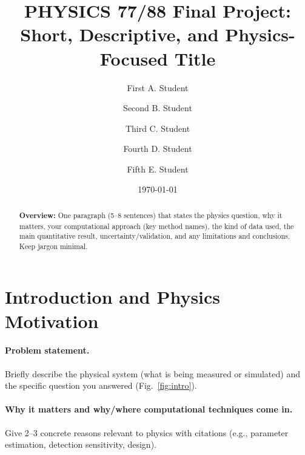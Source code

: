 \documentclass[reprint, superscriptaddress, aps]{revtex4-2}
\begin{document}
\title{PHYSICS 77/88 Final Project: \\Short, Descriptive, and Physics-Focused Title}

\author{First A. Student}  %

\author{Second B. Student}  %

\author{Third C. Student}  %

\author{Fourth D. Student}  %

\author{Fifth E. Student}  %

\date{\today}

\begin{abstract}
\textbf{Overview:} One paragraph (5--8 sentences) that states the physics question, why it matters, your computational approach (key method names), the kind of data used, the main quantitative result, uncertainty/validation, and any limitations and conclusions. Keep jargon minimal.
\end{abstract}


\maketitle

\section{Introduction and Physics Motivation}

\paragraph*{Problem statement.} Briefly describe the physical system (what is being measured or simulated) and the specific question you answered (Fig.~\ref{fig:intro}).

\paragraph*{Why it matters and why/where computational techniques come in.} Give 2--3 concrete reasons relevant to physics with citations \cite{greenwade93} (e.g., parameter estimation, detection sensitivity, design).
\end{document}
